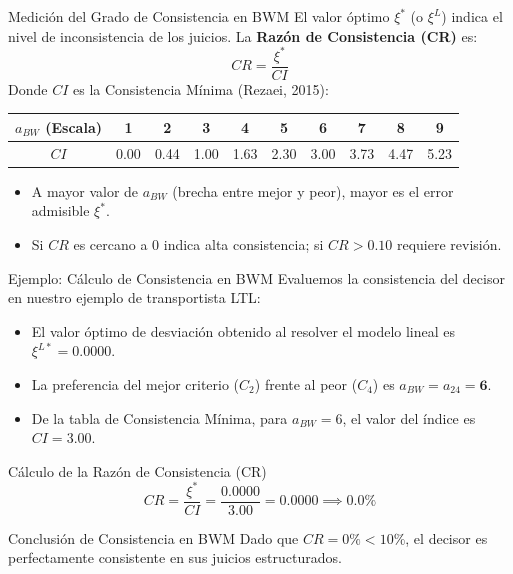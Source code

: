 \documentclass[aspectratio=169, 10pt]{beamer}
\begin{document}
\begin{frame}{Medición del Grado de Consistencia en BWM}
    \small
    El valor óptimo $\xi^*$ (o $\xi^L$) indica el nivel de inconsistencia de los juicios. La \textbf{Razón de Consistencia (CR)} es:
    \[ CR = \frac{\xi^*}{CI} \]
    Donde $CI$ es la Consistencia Mínima (Rezaei, 2015):
    \begin{center}
        \scriptsize
        \begin{tabular}{cccccccccc}
            \toprule
            $a_{BW}$ (Escala) & 1 & 2 & 3 & 4 & 5 & 6 & 7 & 8 & 9 \\
            \midrule
            $CI$ & 0.00 & 0.44 & 1.00 & 1.63 & 2.30 & 3.00 & 3.73 & 4.47 & 5.23 \\
            \bottomrule
        \end{tabular}
    \end{center}
    \begin{itemize}
        \item A mayor valor de $a_{BW}$ (brecha entre mejor y peor), mayor es el error admisible $\xi^*$.
        \item Si $CR$ es cercano a 0 indica alta consistencia; si $CR > 0.10$ requiere revisión.
    \end{itemize}
\end{frame}

\begin{frame}{Ejemplo: Cálculo de Consistencia en BWM}
    Evaluemos la consistencia del decisor en nuestro ejemplo de transportista LTL:
    \begin{itemize}
        \item El valor óptimo de desviación obtenido al resolver el modelo lineal es $\xi^{L*} = \mathbf{0.0000}$.
        \item La preferencia del mejor criterio ($C_2$) frente al peor ($C_4$) es $a_{BW} = a_{24} = \mathbf{6}$.
        \item De la tabla de Consistencia Mínima, para $a_{BW} = 6$, el valor del índice es $CI = \mathbf{3.00}$.
    \end{itemize}
    \begin{block}{Cálculo de la Razón de Consistencia (CR)}
        \[ CR = \frac{\xi^*}{CI} = \frac{0.0000}{3.00} = \mathbf{0.0000} \implies \mathbf{0.0\%} \]
    \end{block}
    \begin{alertblock}{Conclusión de Consistencia en BWM}
        Dado que $CR = 0\% < 10\%$, el decisor es perfectamente consistente en sus juicios estructurados.
    \end{alertblock}
\end{frame}
\end{document}
